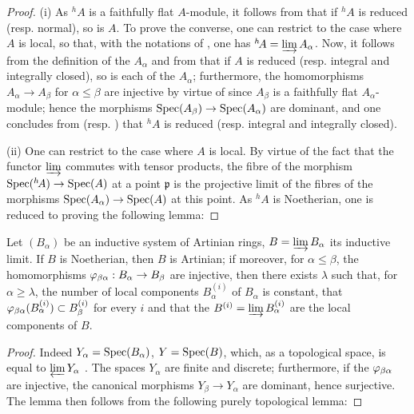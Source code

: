 \begin{proof}
(i) As ${}^h\!A$ is a faithfully flat $A$-module, it follows from  that if ${}^h\!A$ is reduced (resp. normal), so is $A$.
To prove the converse, one can restrict to the case where $A$ is local, so that, with the notations of , one has ${}^h\!A=\varinjlim A_\alpha$.
Now, it follows from the definition of the $A_\alpha$ and from  that if $A$ is reduced (resp. integral and integrally closed), so is each of the $A_\alpha$;
furthermore, the homomorphisms $A_\alpha\to A_\beta$ for $\alpha\leq\beta$ are injective by virtue of  since $A_\beta$ is a faithfully flat $A_\alpha$-module;
hence the morphisms $\operatorname{Spec}(A_\beta)\to\operatorname{Spec}(A_\alpha)$ are dominant, and one concludes from  (resp. ) that ${}^h\!A$ is reduced (resp. integral and integrally closed).

(ii) One can restrict to the case where $A$ is local.
By virtue of the fact that the functor $\varinjlim$ commutes with tensor products, the fibre of the morphism $\operatorname{Spec}({}^h\!A)\to\operatorname{Spec}(A)$ at a point $\mathfrak{p}$ is the projective limit of the fibres of the morphisms $\operatorname{Spec}(A_\alpha)\to\operatorname{Spec}(A)$ at this point.
As ${}^h\!A$ is Noetherian, one is reduced to proving the following lemma:
\end{proof}

\begin{lemma}[18.6.9.1]
\label{IV.18.6.9.1}
Let $(B_\alpha)$ be an inductive system of Artinian rings, $B=\varinjlim B_\alpha$ its inductive limit.
If $B$ is Noetherian, then $B$ is Artinian;
if moreover, for $\alpha\leq\beta$, the homomorphisms $\varphi_{\beta\alpha}:B_\alpha\to B_\beta$ are injective, then there exists $\lambda$ such that, for $\alpha\geq\lambda$, the number of local components $B_\alpha^{(i)}$ of $B_\alpha$ is constant, that $\varphi_{\beta\alpha}(B_\alpha^{(i)})\subset B_\beta^{(i)}$ for every $i$ and that the $B^{(i)}=\varinjlim B_\alpha^{(i)}$ are the local components of $B$.
\end{lemma}

\begin{proof}
Indeed $Y_\alpha=\operatorname{Spec}(B_\alpha)$, $Y=\operatorname{Spec}(B)$, which, as a topological space, is equal to $\varprojlim Y_\alpha$ .
The spaces $Y_\alpha$ are finite and discrete;
furthermore, if the $\varphi_{\beta\alpha}$ are injective, the canonical morphisms $Y_\beta\to Y_\alpha$ are dominant, hence surjective.
The lemma then follows from the following purely topological lemma:
\end{proof}

